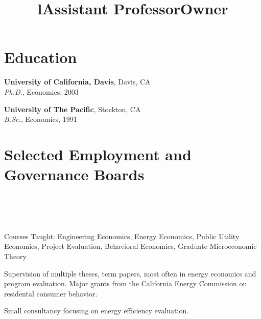 \documentclass[margin]{res}
\begin{document}
\begin{resume}

\section{Education}
\textbf{University of California, Davis}, Davis, CA\\
{\sl Ph.D.}, Economics, 2003

\textbf{University of The Pacific}, Stockton, CA\\
{\sl B.Sc.}, Economics, 1991


\section{Selected Employment and Governance Boards}

\begin{format}
\title{l}\\
\\
\body\\
\end{format}

\title{\textbf{Assistant Professor}}
\begin{position}
Courses Taught: Engineering Economics, Energy Economics, Public Utility Economics, Project Evaluation, Behavioral Economics, Graduate Microeconomic Theory

Supervision of multiple theses, term papers, most often in energy economics and program evaluation. Major grants from the California Energy Commission on residental consumer behavior. 

\end{position}

\title{\textbf{Owner}}
\begin{position}
Small consultancy focusing on energy efficiency evaluation.


\end{position}
\end{resume}
\end{document}
